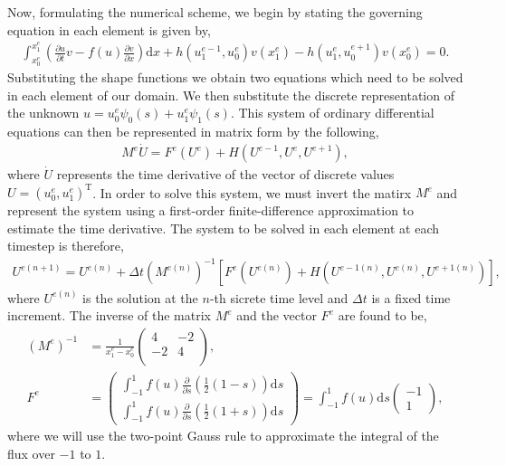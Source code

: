 \documentclass[a4paper, 12pt]{article}
\begin{document}
Now, formulating the numerical scheme, we begin by stating the governing equation in each element is given by,
\begin{align*}
\int_{x^e_0}^{x^e_1}\left(\frac{\partial u}{\partial t}v - f(u)\frac{\partial v}{\partial x}\right)\mathrm{d}x + h(u^{e-1}_1,u^e_0)v(x^e_1) - h(u^{e}_1,u^{e+1}_0)v(x^e_0)= 0.
\end{align*}
Substituting the shape functions we obtain two equations which need to be solved in each element of our domain. We then substitute the discrete representation of the unknown $u = u^e_0 \psi_0(s) + u^e_1 \psi_1(s)$. This system of ordinary differential equations can then be represented in matrix form by the following,
\begin{align*}
M^e \dot U = F^e(U^e) + H(U^{e-1},U^{e},U^{e+1}),
\end{align*}
where $\dot U$ represents the time derivative of the vector of discrete values $U = (u^e_0,u^e_1)^\mathrm{T}$. In order to solve this system, we must invert the matirx $M^e$ and represent the system using a first-order finite-difference approximation to estimate the time derivative. The system to be solved in each element at each timestep is therefore,
\begin{align*}
U^{e(n+1)}=U^{e(n)} + \Delta t (M^{e(n)})^{-1} [ F^e(U^{e(n)}) + H(U^{e-1(n)},U^{e(n)},U^{e+1(n)}) ],
\end{align*}
where $U^{e(n)}$ is the solution at the $n$-th sicrete time level and $\Delta t$ is a fixed time increment. The inverse of the matrix $M^e$ and the vector $F^e$ are found to be,
\begin{align*} 
(M^e)^{-1} &= \frac{1}{x^e_1-x^e_0}\begin{pmatrix} 4 & -2 \\ -2 & 4 \\ \end{pmatrix}, \\
F^e &= \begin{pmatrix} \int_{-1}^{1}f(u)\frac{\partial}{\partial s}(\frac{1}{2}(1-s))\mathrm{d}s \\ \int_{-1}^{1}f(u)\frac{\partial}{\partial s}(\frac{1}{2}(1+s))\mathrm{d}s \end{pmatrix} = \int_{-1}^{1}f(u)\mathrm{d}s\begin{pmatrix} -1 \\ 1 \end{pmatrix},
\end{align*}
where we will use the two-point Gauss rule to approximate the integral of the flux over $-1$ to $1$.\\ 
\end{document}
